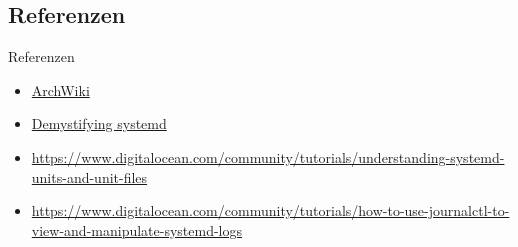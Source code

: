 \subsection{Referenzen}

\begin{frame}{Referenzen}
\begin{itemize}	
	\item \href{https://wiki.archlinux.org/index.php/systemd}{ArchWiki}

	\item \href{https://www.redhat.com/files/summit/session-assets/2017/S103870-Demystifying-systemd.pdf}{Demystifying systemd}
	\item \href{https://www.digitalocean.com/community/tutorials/understanding-systemd-units-and-unit-files}{https://www.digitalocean.com/community/tutorials/understanding-systemd-units-and-unit-files}

	\item \href{https://www.digitalocean.com/community/tutorials/how-to-use-journalctl-to-view-and-manipulate-systemd-logs}{https://www.digitalocean.com/community/tutorials/how-to-use-journalctl-to-view-and-manipulate-systemd-logs}
\end{itemize}
\end{frame}



